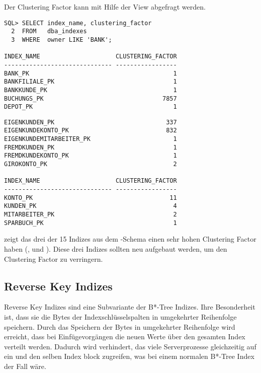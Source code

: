           Der Clustering Factor kann mit Hilfe der View
           abgefragt werden.
          \begin{lstlisting}[caption={Den Index Clustering Factor anzeigen},label=admin319,language=oracle_sql]
SQL> SELECT index_name, clustering_factor
  2  FROM   dba_indexes
  3  WHERE  owner LIKE 'BANK';

INDEX_NAME                     CLUSTERING_FACTOR
------------------------------ -----------------
BANK_PK                                        1
BANKFILIALE_PK                                 1
BANKKUNDE_PK                                   1
BUCHUNGS_PK                                 7857
DEPOT_PK                                       1
					\end{lstlisting}
\clearpage
\begin{lstlisting}[language=oracle_sql]
EIGENKUNDEN_PK                               337
EIGENKUNDEKONTO_PK                           832
EIGENKUNDEMITARBEITER_PK                       1
FREMDKUNDEN_PK                                 1
FREMDKUNDEKONTO_PK                             1
GIROKONTO_PK                                   2

INDEX_NAME                     CLUSTERING_FACTOR
------------------------------ -----------------
KONTO_PK                                      11
KUNDEN_PK                                      4
MITARBEITER_PK                                 2
SPARBUCH_PK                                    1
\end{lstlisting}
           zeigt das drei der 15 Indizes aus dem -Schema einen sehr hohen Clustering Factor haben (,  und ). Diese drei Indizes sollten neu aufgebaut werden, um den Clustering Factor zu verringern.
      \subsection{Reverse Key Indizes}
        Reverse Key Indizes sind eine Subvariante der B*-Tree Indizes. Ihre Besonderheit ist, dass sie die Bytes der Indexschlüsselspalten in umgekehrter Reihenfolge speichern. Durch das Speichern der Bytes in umgekehrter Reihenfolge wird erreicht, dass bei Einfügevorgängen die neuen Werte über den gesamten Index verteilt werden. Dadurch wird verhindert, das viele Serverprozesse gleichzeitig auf ein und den selben Index block zugreifen, was bei einem normalen B*-Tree Index der Fall wäre.

